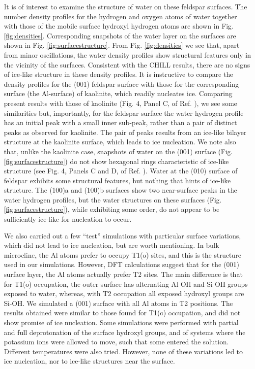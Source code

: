 \documentclass[preprint,aps,prb,floatfix]{revtex4-1}
\begin{document}
It is of interest to examine the structure of water on these feldspar surfaces. The number density profiles for the hydrogen and oxygen atoms of water together with those of the mobile surface hydroxyl hydrogen atoms are shown in Fig. \ref{fig:densities}. Corresponding snapshots of the water layer on the surfaces are shown in Fig. \ref{fig:surfacestructure}. From Fig. \ref{fig:densities} we see that, apart from minor oscillations, the water density profiles show structural features only in the vicinity of the surfaces. Consistent with the CHILL results, there are no signs of ice-like structure in these density profiles. It is instructive to compare the density profiles for the (001) feldspar surface with those for the corresponding surface (the Al-surface) of kaolinite, which readily nucleates ice. Comparing present results with those of kaolinite (Fig. 4, Panel C, of Ref. ), we see some similarities but, importantly, for the feldspar surface the water hydrogen profile has an initial peak with a small inner sub-peak, rather than a pair of distinct peaks as observed for kaolinite. The pair of peaks results from an ice-like bilayer structure at the kaolinite surface, which leads to ice nucleation. We note also that, unlike the kaolinite case, snapshots of water on the (001) surface (Fig. \ref{fig:surfacestructure}) do not show hexagonal rings characteristic of ice-like structure (see Fig. 4, Panels C and D, of Ref. ). Water at the (010) surface of feldspar exhibits some structural features, but nothing that hints of ice-like structure. The (100)a and (100)b surfaces show two near-surface peaks in the water hydrogen profiles, but the water structures on these surfaces (Fig. \ref{fig:surfacestructure}), while exhibiting some order, do not appear to be sufficiently ice-like for nucleation to occur.

We also carried out a few ``test'' simulations with particular surface variations, which did not lead to ice nucleation, but are worth mentioning. In bulk microcline, the Al atoms prefer to occupy T1(o) sites,\cite{KR87} and this is the structure used in our simulations. However, DFT calculations\cite{PCSM16} suggest that for the (001) surface layer, the Al atoms actually prefer T2 sites. The main difference is that for T1(o) occupation, the outer surface has alternating Al-OH and Si-OH groups exposed to water, whereas, with T2 occupation all exposed hydroxyl groups are Si-OH. We simulated a (001) surface with all Al atoms in T2 positions. The results obtained were similar to those found for T1(o) occupation, and did not show promise of ice nucleation. Some simulations were performed with partial and full deprotonation of the surface hydroxyl groups, and of systems where the potassium ions were allowed to move, such that some entered the solution. Different temperatures were also tried. However, none of these variations led to ice nucleation, nor to ice-like structures near the surface.   
\end{document}
